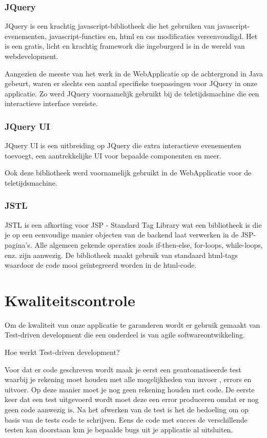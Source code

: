 \documentclass[pdftex,a4paper,12pt,twoside]{report}
\begin{document}
\subsection{JQuery}
JQuery is een krachtig javascript-bibliotheek die het gebruiken van javascript-evenementen, javascript-functies en, html en css modificaties vereenvoudigd. Het is een gratis, licht en krachtig framework die ingeburgerd is in de wereld van webdevelopment.

Aangezien de meeste van het werk in de WebApplicatie op de achtergrond in Java gebeurt, waren er slechts een aantal specifieke toepassingen voor JQuery in onze applicatie. Zo werd JQuery voornamelijk gebruikt bij de teletijdsmachine die een interactieve interface vereiste.


\subsection{JQuery UI}
JQuery UI is een uitbreiding op JQuery die extra interactieve evenementen toevoegt, een aantrekkelijke UI voor bepaalde componenten en meer.

Ook deze bibliotheek werd voornamelijk gebruikt in de WebApplicatie voor de teletijdsmachine.


\subsection{JSTL}
JSTL is een afkorting voor JSP - Standard Tag Library wat een bibliotheek is die je op een eenvoudige manier objecten van de backend laat verwerken in de JSP-pagina's. Alle algemeen gekende operaties zoals if-then-else, for-loops, while-loops, enz. zijn aanwezig. De bibliotheek maakt gebruik van standaard html-tags waardoor de code mooi geïntegreerd worden in de html-code.

 
 \chapter{Kwaliteitscontrole}
 

Om de kwaliteit van onze applicatie te garanderen wordt er gebruik gemaakt van Test-driven development die een onderdeel is van agile softwareontwikkeling.

Hoe werkt Test-driven development?

Voor dat er code geschreven wordt maak je eerst een geautomatiseerde test waarbij je rekening moet houden met alle mogelijkheden van invoer , errors en uitvoer. Op deze manier moet je nog geen rekening houden met code.
De eerste keer dat een test uitgevoerd wordt moet deze een error produceren omdat er nog geen code aanwezig is.
Na het afwerken van de test is het de bedoeling om op basis van de tests code te schrijven.
Eens de code met succes de verschillende testen kan doorstaan kun je bepaalde bugs uit je applicatie al uitsluiten.
\end{document}
